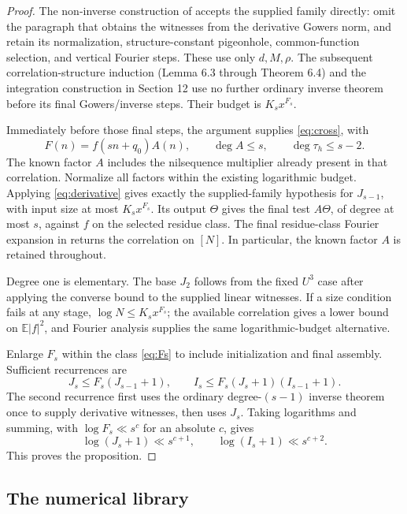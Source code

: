 \documentclass[11pt,a4paper]{article}
\theoremstyle{definition}
\newcommand{\E}{\mathbb E}
\begin{document}
\begin{proof}
The non-inverse construction of \cite[Lemma 6.2]{lss}
accepts the supplied family directly: omit the paragraph
that obtains the witnesses from the derivative Gowers
norm, and retain its normalization, structure-constant
pigeonhole, common-function selection, and vertical
Fourier steps. These use only \(d,M,\rho\).
The subsequent correlation-structure induction
(Lemma 6.3 through Theorem 6.4) and the integration
construction in Section 12 use no further ordinary
inverse theorem before its final Gowers/inverse steps.
Their budget is \(K_sx^{F_s}\).

Immediately before those final steps, the argument
supplies \eqref{eq:cross}, with
\[
 F(n)=f(sn+q_0)A(n),\qquad \deg A\le s,\qquad
 \deg\tau_h\le s-2.
\]
The known factor \(A\) includes the nilsequence
multiplier already present in that correlation.
Normalize all factors within the existing logarithmic
budget. Applying \eqref{eq:derivative} gives exactly
the supplied-family hypothesis for \(J_{s-1}\),
with input size at most \(K_sx^{F_s}\). Its output
\(\Theta\) gives the final test \(A\Theta\), of
degree at most \(s\), against \(f\) on the selected
residue class. The final residue-class Fourier
expansion in \cite{lss} returns the correlation on
\([N]\). In particular, the known factor \(A\)
is retained throughout.

Degree one is elementary. The base \(J_2\) follows from the fixed \(U^3\)
case after applying the converse bound to the supplied
linear witnesses. If a size condition fails at any
stage, \(\log N\le K_sx^{F_s}\); the available
correlation gives a lower bound on \(\E|f|^2\), and
Fourier analysis supplies the same logarithmic-budget
alternative.

Enlarge \(F_s\) within the class \eqref{eq:Fs} to
include initialization and final assembly. Sufficient
recurrences are
\begin{equation}\label{eq:IJ}
 J_s\le F_s(J_{s-1}+1),\qquad
 I_s\le F_s(J_s+1)(I_{s-1}+1).
\end{equation}
The second recurrence first uses the ordinary
degree-\((s-1)\) inverse theorem once to supply
derivative witnesses, then uses \(J_s\).
Taking logarithms and summing, with
\(\log F_s\ll s^c\) for an absolute \(c\), gives
\[
 \log(J_s+1)\ll s^{c+1},\qquad
 \log(I_s+1)\ll s^{c+2}.
\]
This proves the proposition.
\end{proof}

\subsection{The numerical library}
\end{document}
